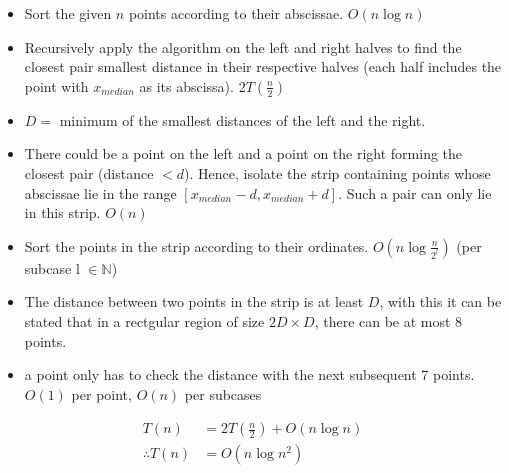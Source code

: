 \begin{itemize}
	\item Sort the given $n$ points according to their abscissae. \rightarrow $O(n \log n)$
	\item Recursively apply the algorithm on the left and right halves to find the closest pair smallest distance in their respective halves (each half includes the point with $x_{median}$ as its abscissa). \rightarrow $2T(\frac{n}{2})$
	\item $D = $ minimum of the smallest distances of the left and the right.
	\item There could be a point on the left and a point on the right forming the closest pair (distance $< d$). Hence, isolate the strip containing points whose abscissae lie in the range $[x_{median}-d, x_{median}+d]$. Such a pair can only lie in this strip. \rightarrow $O(n)$
	\item Sort the points in the strip according to their ordinates. \rightarrow $O(n \log \frac{n}{2^l})$ (per subcase l $\in \mathbb{N}$)
	\item The distance between two points in the strip is at least $D$, with this it can be stated that in a rectgular region of size $2D \times D$, there can be at most 8 points.
	\item \therefore a point only has to check the distance with the next subsequent 7 points. \rightarrow $O(1)$ per point, $O(n)$ per subcases
\end{itemize}

\begin{align*}
	T(n)            & = 2T\left(\frac{n}{2}\right) + O(n \log n) \\
	\therefore T(n) & = O(n \log n^2)
\end{align*}

